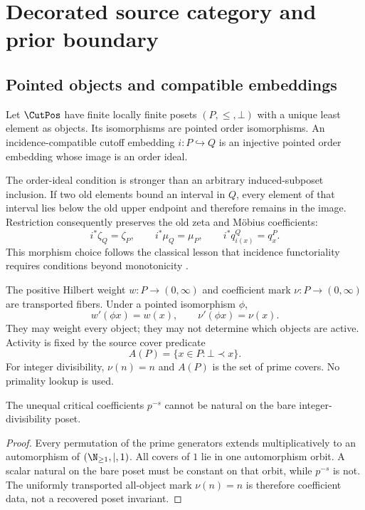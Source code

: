\section{Decorated source category and prior boundary}
\label{sec:category}

\subsection{Pointed objects and compatible embeddings}

\begin{definition}
Let $\CutPos$ have finite locally finite posets $(P,\le,\bot)$ with a unique
least element as objects.  Its isomorphisms are pointed order isomorphisms.
An incidence-compatible cutoff embedding $i:P\hookrightarrow Q$ is an
injective pointed order embedding whose image is an order ideal.
\end{definition}

The order-ideal condition is stronger than an arbitrary induced-subposet
inclusion.  If two old elements bound an interval in $Q$, every element of
that interval lies below the old upper endpoint and therefore remains in the
image.  Restriction consequently preserves the old zeta and M\"obius
coefficients:
\begin{equation}
 i^*\zeta_Q=\zeta_P,
 \qquad
 i^*\mu_Q=\mu_P,
 \qquad
 i^*q^Q_{i(x)}=q^P_x.
 \label{eq:incidence-restriction}
\end{equation}
This morphism choice follows the classical lesson that incidence
functoriality requires conditions beyond monotonicity
\citep{ContentLemayLeroux1980,AguiarFerrer2000,GalvezKockTonks2018}.

The positive Hilbert weight $w:P\to(0,\infty)$ and coefficient mark
$\nu:P\to(0,\infty)$ are transported fibers.  Under a pointed isomorphism
$\phi$,
\begin{equation}
 w'(\phi x)=w(x),\qquad \nu'(\phi x)=\nu(x).
 \label{eq:transported-decorations}
\end{equation}
They may weight every object; they may not determine which objects are
active.  Activity is fixed by the source cover predicate
\begin{equation}
 A(P)=\{x\in P:\bot\prec x\}.
 \label{eq:cover-predicate}
\end{equation}
For integer divisibility, $\nu(n)=n$ and $A(P)$ is the set of prime covers.
No primality lookup is used.

\begin{proposition}
The unequal critical coefficients $p^{-s}$ cannot be natural on the bare
integer-divisibility poset.
\end{proposition}
\begin{proof}
Every permutation of the prime generators extends multiplicatively to an
automorphism of $(\N_{\ge1},\mid,1)$.  All covers of $1$ lie in one
automorphism orbit.  A scalar natural on the bare poset must be constant on
that orbit, while $p^{-s}$ is not.  The uniformly transported all-object mark
$\nu(n)=n$ is therefore coefficient data, not a recovered poset invariant.
\end{proof}

